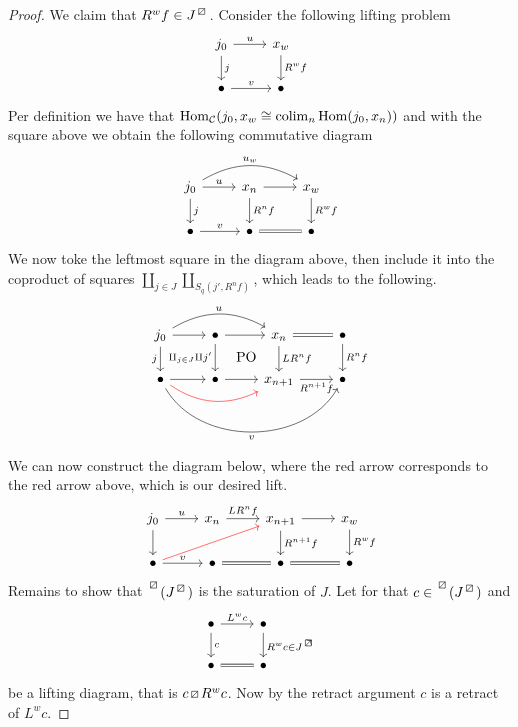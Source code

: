 \begin{proof}
    We claim that $R^wf \in J^{\lift{}}$.
    Consider the following lifting problem
    \[
    \begin{tikzcd}
        j_0
        \ar[r,"u"]
        \ar[d,"j"]
        &
        x_w
        \ar[d, "R^wf"]
        \\
        \bullet 
        \ar[r,"v"]
        &
        \bullet
    \end{tikzcd}
    \]
    Per definition we have that $ \operatorname{Hom}_{\mathcal{C}} ( j_0 , x_w \cong \operatorname{colim}_n \operatorname{Hom} ( j_0 , x_n ))$ and with the square above we obtain the following commutative diagram
    \[
    \begin{tikzcd}
    	j_0
    	\ar[r, "u"]
    	\ar[d, "j"]
    	\ar[rr, bend left, "u_w"]
    	&
    	x_n
    	\ar[d, "R^nf"]
    	\ar[r]
    	&
    	x_w
    	\ar[d,"R^wf"]
    	\\
    	\bullet
    	\ar[r, "v"]	
    	&
    	\bullet
    	\ar[r, equal]
    	&
    	\bullet
    \end{tikzcd}
	\]
	We now toke the leftmost square in the diagram above, then include it into the coproduct of squares $\amalg_{j \in J} \amalg_{S_q(j',R^nf)}$, which leads to the following.  
	\[
	\begin{tikzcd}
		j_0
		\ar[r]
		\ar[d,"j"']
		\ar[rr, bend left, "u"]
		&
		\bullet
		\ar[d, "\amalg_{j \in J} \amalg j'"']
		\ar[r]
		\ar[rd, phantom, "\PO"]
		&
		x_n
		\ar[d, "LR^nf"]
		\ar[r, equal]
		&
		\bullet
		\ar[d, "R^nf"]
		\\
		\bullet
		\ar[rrr, bend right=60, "v"']
		\ar[r]
		\ar[rr, bend right, red]
		& 
		\bullet
		\ar[r]
		&
		x_{n+1}
		\ar[r, "R^{n+1}f"']
		&
		\bullet
	\end{tikzcd}
	\]
	We can now construct the diagram below, where the red arrow corresponds to the red arrow above, which is our desired lift.
	\[
	\begin{tikzcd}
		j_0
		\ar[r, "u"]
		\ar[d]
		&
		x_n
		\ar[r, "LR^nf"]
		&
		x_{n+1}
		\ar[d, "R^{n+1}f"]
		\ar[r]
		&
		x_w
		\ar[d, "R^wf"]
		\\
		\bullet
		\ar[rru, red]
		\ar[r, "v"]
		&
		\bullet
		\ar[r, equal]
		&
		\bullet 
		\arrow[r, equal]
		&
		\bullet
	\end{tikzcd}
	\]
	Remains to show that $\prescript{\lift{}}{}{(J^{\lift{}})}$ is the saturation of $ J $. Let for that $c \in \prescript{\lift{}}{}{(J^{\lift{}})}$ and 
	\[
	\begin{tikzcd}
		\bullet
		\ar[r, " L^wc"]
		\ar[d, "c"]
		&
		\bullet
		\ar[d,"R^wc \in J^{\lift{}}"]
		\\
		\bullet
		\ar[r, equal]
		&
		\bullet
	\end{tikzcd}
	\] 
 	be a lifting diagram, that is $ c \lift{} R^wc$.
	Now by the retract argument $c$ is a retract of $ L^w c $.
\end{proof}